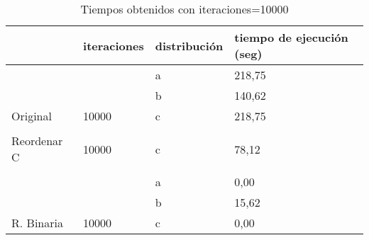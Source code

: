 \documentclass{article}
\begin{document}
	\vspace{1.cm}
	
	\begin{table}[h]
		\begin{tabular}{llll}
			\hline
			\rowcolor[HTML]{F8A102} 
			\multicolumn{1}{|l|}{\cellcolor[HTML]{F8A102}modificación} & \multicolumn{1}{l|}{\cellcolor[HTML]{F8A102}iteraciones} & \multicolumn{1}{l|}{\cellcolor[HTML]{F8A102}distribución} & \multicolumn{1}{l|}{\cellcolor[HTML]{F8A102}tiempo de ejecución (seg)} \\ \hline
			\multicolumn{1}{|l|}{}                                     & \multicolumn{1}{l|}{}                                    & \multicolumn{1}{l|}{a}                                    & \multicolumn{1}{l|}{218,75}                                      \\ \cline{3-4} 
			\multicolumn{1}{|l|}{}                                     & \multicolumn{1}{l|}{}                                    & \multicolumn{1}{l|}{b}                                    & \multicolumn{1}{l|}{140,62}                                      \\ \cline{3-4} 
			\multicolumn{1}{|l|}{\multirow{-3}{*}{Original}}           & \multicolumn{1}{l|}{\multirow{-3}{*}{10000}}             & \multicolumn{1}{l|}{c}                                    & \multicolumn{1}{l|}{218,75}                                      \\ \hline
			&                                                          &                                                           &                                                                  \\ \hline
			\multicolumn{1}{|l|}{Reordenar C}                          & \multicolumn{1}{l|}{10000}                               & \multicolumn{1}{l|}{c}                                    & \multicolumn{1}{l|}{78,12}                                       \\ \hline
			&                                                          &                                                           &                                                                  \\ \hline
			\multicolumn{1}{|l|}{}                                     & \multicolumn{1}{l|}{}                                    & \multicolumn{1}{l|}{a}                                    & \multicolumn{1}{l|}{0,00}                                        \\ \cline{3-4} 
			\multicolumn{1}{|l|}{}                                     & \multicolumn{1}{l|}{}                                    & \multicolumn{1}{l|}{b}                                    & \multicolumn{1}{l|}{15,62}                                       \\ \cline{3-4} 
			\multicolumn{1}{|l|}{\multirow{-3}{*}{R. Binaria}}         & \multicolumn{1}{l|}{\multirow{-3}{*}{10000}}             & \multicolumn{1}{l|}{c}                                    & \multicolumn{1}{l|}{0,00}                                        \\ \hline
		\end{tabular}
	\caption{Tiempos obtenidos con iteraciones=10000}
	\end{table}
\end{document}
